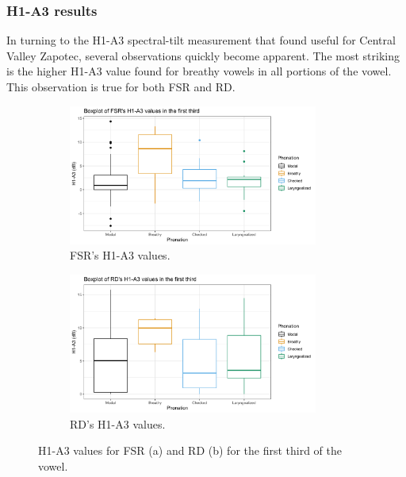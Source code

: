 \documentclass[12pt, letterpaper]{article}
\begin{document}
\subsubsection{H1-A3 results} \label{sec:H1A3}

In turning to the H1-A3 spectral-tilt measurement that \citet{espositoVariationContrastivePhonation2010} found useful for Central Valley Zapotec, several observations quickly become apparent. The most striking is the higher H1-A3 value found for breathy vowels in all portions of the vowel. This observation is true for both FSR and RD. 

\begin{figure}[!h]
	\centering
	\begin{subfigure}{.5\textwidth}
		\centering
		\includegraphics[width=0.9\textwidth]{../mean_FSR_h1a3_First.png}
		\caption{FSR's H1-A3 values.}
		\label{fig:FSRh1a3first} 
	\end{subfigure}%
	\begin{subfigure}{.5\textwidth}
		\centering
		\includegraphics[width=0.9\textwidth]{../mean_RD_h1a3_First.png}
		\caption{RD's H1-A3 values.}
		\label{fig:RDh1a3first} 
	\end{subfigure}
	\caption{H1-A3 values for FSR (a) and RD (b) for the first third of the vowel. }
	\label{fig:h1a3first}
\end{figure}
\end{document}
